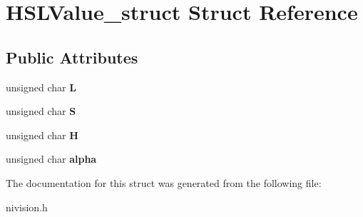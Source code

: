 \hypertarget{structHSLValue__struct}{\section{\-H\-S\-L\-Value\-\_\-struct \-Struct \-Reference}
\label{structHSLValue__struct}
}
\subsection*{\-Public \-Attributes}
\begin{DoxyCompactItemize}
\item 
\hypertarget{structHSLValue__struct_a4174a450f436d081b146b70093213c7d}{unsigned char {\bfseries \-L}}\label{structHSLValue__struct_a4174a450f436d081b146b70093213c7d}

\item 
\hypertarget{structHSLValue__struct_a5fc0193ce8874725a6ca95f792960ece}{unsigned char {\bfseries \-S}}\label{structHSLValue__struct_a5fc0193ce8874725a6ca95f792960ece}

\item 
\hypertarget{structHSLValue__struct_afc7c6b622d49118245832e93e150c00b}{unsigned char {\bfseries \-H}}\label{structHSLValue__struct_afc7c6b622d49118245832e93e150c00b}

\item 
\hypertarget{structHSLValue__struct_aa8c3650c8b64ac67c3dcc107b2724b14}{unsigned char {\bfseries alpha}}\label{structHSLValue__struct_aa8c3650c8b64ac67c3dcc107b2724b14}

\end{DoxyCompactItemize}


\-The documentation for this struct was generated from the following file\-:\begin{DoxyCompactItemize}
\item 
nivision.\-h\end{DoxyCompactItemize}
